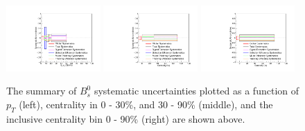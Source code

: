 \begin{figure}[hbtp]
\begin{center}
\includegraphics[width=0.32\textwidth]{Figures/Chapter4/BsPtSyst.pdf}
\includegraphics[width=0.32\textwidth]{Figures/Chapter4/BsCentSyst.pdf}
\includegraphics[width=0.32\textwidth]{Figures/Chapter4/BsIncSyst.pdf}
\caption{The summary of $B^0_s$ systematic uncertainties plotted as a function of $p_T$ (left), centrality in 0 - 30\%, and 30 - 90\% (middle), and the inclusive centrality bin 0 - 90\% (right) are shown above.}
\label{BsSystSumPlot}
\end{center}
\end{figure}

